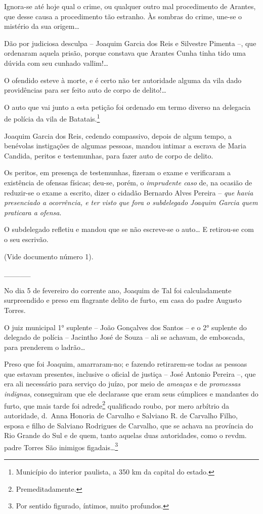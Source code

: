 Ignora-se até hoje qual o crime, ou qualquer outro mal procedimento de
Arantes, que desse causa a procedimento tão estranho. Às sombras do
crime, une-se o mistério da sua origem\ldots{}

Dão por judiciosa desculpa -- Joaquim Garcia dos Reis e Silvestre
Pimenta --, que ordenaram aquela prisão, porque constava que Arantes
Cunha tinha tido uma dúvida com seu cunhado vallim!\ldots{}

O ofendido esteve à morte, e é certo não ter autoridade alguma da vila
dado providências para ser feito auto de corpo de delito!\ldots{}

O auto que vai junto a esta petição foi ordenado em termo diverso na
delegacia de polícia da vila de Batatais.\footnote{ Município do
  interior paulista, a 350 km da capital do estado.}

Joaquim Garcia dos Reis, cedendo compassivo, depois de algum tempo, a
benévolas instigações de algumas pessoas, mandou intimar a escrava de
Maria Candida, peritos e testemunhas, para fazer auto de corpo de
delito.

Os peritos, em presença de testemunhas, fizeram o exame e verificaram a
existência de ofensas físicas; deu-se, porém, o \emph{imprudente caso}
de, na ocasião de reduzir-se o exame a escrito, dizer o cidadão Bernardo
Alves Pereira -- \emph{que havia presenciado a ocorrência, e ter visto
que fora o subdelegado Joaquim Garcia quem praticara a ofensa}.

O subdelegado refletiu e mandou que se não escreve-se o auto\ldots{} E
retirou-se com o seu escrivão.

(Vide documento número 1).

\_\_\_\_\_

No dia 5 de fevereiro do corrente ano, Joaquim de Tal foi calculadamente
surpreendido e preso em flagrante delito de furto, em casa do padre
Augusto Torres.

O juiz municipal 1° suplente -- João Gonçalves dos Santos -- e o 2°
suplente do delegado de polícia -- Jacintho José de Souza -- ali se
achavam, de emboscada, para prenderem o ladrão\ldots{}

Preso que foi Joaquim, amarraram-no; e fazendo retirarem-se todas as
pessoas que estavam presentes, inclusive o oficial de justiça -- José
Antonio Pereira --, que era ali necessário para serviço do juízo, por
meio de \emph{ameaças} e de \emph{promessas indignas}, conseguiram que
ele declarasse que eram seus cúmplices e mandantes do furto, que mais
tarde foi adrede\footnote{ Premeditadamente.} qualificado roubo, por
mero arbítrio da autoridade, d.~Anna Honoria de Carvalho e Salviano R.
de Carvalho Filho, esposa e filho de Salviano Rodrigues de Carvalho, que
se achava na província do Rio Grande do Sul e de quem, tanto aquelas
duas autoridades, como o revdm. padre Torres São inimigos
figadais\ldots{}\footnote{ Por sentido figurado, íntimos, muito profundos.}

